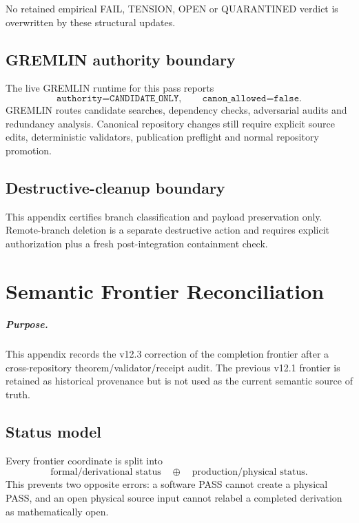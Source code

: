 No retained empirical FAIL, TENSION, OPEN or QUARANTINED verdict is overwritten
by these structural updates.

\section{GREMLIN authority boundary}

The live GREMLIN runtime for this pass reports
\[
\boxed{
\texttt{authority=CANDIDATE\_ONLY},
\qquad
\texttt{canon\_allowed=false}.
}
\]
GREMLIN routes candidate searches, dependency checks, adversarial audits and
redundancy analysis.  Canonical repository changes still require explicit
source edits, deterministic validators, publication preflight and normal
repository promotion.

\section{Destructive-cleanup boundary}

This appendix certifies branch classification and payload preservation only.
Remote-branch deletion is a separate destructive action and requires explicit
authorization plus a fresh post-integration containment check.

\clearpage

\chapter{Semantic Frontier Reconciliation}
\label{app:v12_semantic_frontier_reconciliation}

\paragraph{Purpose.}
This appendix records the v12.3 correction of the completion frontier after a
cross-repository theorem/validator/receipt audit. The previous v12.1 frontier
is retained as historical provenance but is not used as the current semantic
source of truth.

\section{Status model}

Every frontier coordinate is split into
\[
\boxed{
\text{formal/derivational status}
\quad\oplus\quad
\text{production/physical status}.
}
\]
This prevents two opposite errors: a software PASS cannot create a physical
PASS, and an open physical source input cannot relabel a completed derivation
as mathematically open.

